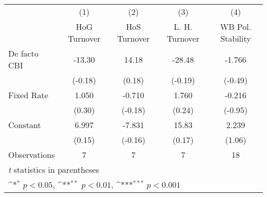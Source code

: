 \begin{table}[htbp]\centering
\def\sym#1{\ifmmode^{#1}\else\(^{#1}\)\fi}
\caption{\label{lowKIfivs4}}
\begin{tabular}{l*{4}{c}}
\toprule
                                        &\multicolumn{1}{c}{(1)}&\multicolumn{1}{c}{(2)}&\multicolumn{1}{c}{(3)}&\multicolumn{1}{c}{(4)}\\
                                        &\multicolumn{1}{c}{HoG Turnover}&\multicolumn{1}{c}{HoS Turnover}&\multicolumn{1}{c}{L. H. Turnover}&\multicolumn{1}{c}{WB Pol. Stability}\\
\midrule
De facto CBI                            &   -13.30         &    14.18         &   -28.48         &   -1.766         \\
                                        &  (-0.18)         &   (0.18)         &  (-0.19)         &  (-0.49)         \\
\addlinespace
Fixed Rate                              &    1.050         &   -0.710         &    1.760         &   -0.216         \\
                                        &   (0.30)         &  (-0.18)         &   (0.24)         &  (-0.95)         \\
\addlinespace
Constant                                &    6.997         &   -7.831         &    15.83         &    2.239         \\
                                        &   (0.15)         &  (-0.16)         &   (0.17)         &   (1.06)         \\
\midrule
Observations                            &        7         &        7         &        7         &       18         \\
\bottomrule
\multicolumn{5}{l}{\footnotesize \textit{t} statistics in parentheses}\\
\multicolumn{5}{l}{\footnotesize \sym{*} \(p<0.05\), \sym{**} \(p<0.01\), \sym{***} \(p<0.001\)}\\
\end{tabular}
\end{table}
